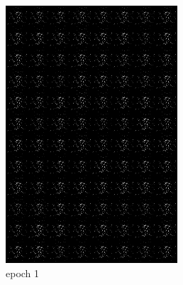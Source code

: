 \documentclass[a4paper]{article}
\theoremstyle{definition}
\newenvironment{soln}{
	\leavevmode\color{blue}\ignorespaces
}{}
\begin{document}
\begin{enumerate} [label=(\alph*)]
\begin{soln}
			\begin{figure}[H]
				\centering
				\begin{subfigure}[b]{0.3\textwidth}
					\centering
					\includegraphics[width=\textwidth]{../outputs-a200/gen_img1.png}
					\caption{epoch 1}
				\end{subfigure}
				\hfill
				\begin{subfigure}[b]{0.3\textwidth}
					\centering

\end{subfigure}
\end{figure}
\end{soln}
\end{enumerate}
\end{document}
